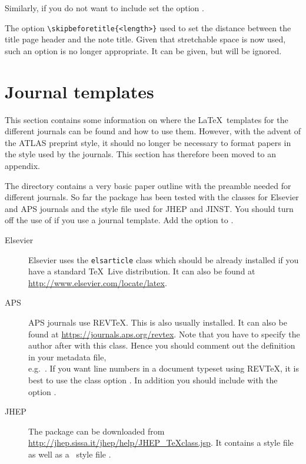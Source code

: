 Similarly, if you do not want to include  set
the option .

The option \verb|\skipbeforetitle{<length>}| used to set the distance between
the title page header and the note title. 
Given that stretchable space is now used, such an option is no longer appropriate.
It can be given, but will be ignored.


\appendix
\section{Journal templates}
\label{sec:journal}

This section contains some information on where the \LaTeX\ templates for the different journals can be found and how to use them.
However, with the advent of the ATLAS preprint style, 
it should no longer be necessary to format papers in the style used by the journals.
This section has therefore been moved to an appendix.

The directory  contains a very basic paper outline with the preamble needed for different journals.
So far the  package has been tested with the classes for Elsevier and APS journals and the style file used for JHEP and JINST.
You should turn off the use of  if you use a journal template.
Add the option  to .

\begin{description}
\item[Elsevier]Elsevier uses the \texttt{elsarticle} class which should be already installed if you have a standard 
  \TeX\ Live distribution. 
  It can also be found at \url{http://www.elsevier.com/locate/latex}.
  
\item[APS]APS journals use REV\TeX. This is also usually installed.
  It can also be found at \url{https://journals.aps.org/revtex}.
  Note that you have to specify the author after \verb|| with this class.
  Hence you should comment out the definition in your metadata file,\\
  e.g.\ .
  If you want line numbers in a document typeset using REV\TeX, it is best to use the class option .
  In addition you should include  with the option .
  
\item[JHEP]The package can be downloaded from \url{http://jhep.sissa.it/jhep/help/JHEP_TeXclass.jsp}. It contains a style file  as well as a \BibTeX\ style file . 
\end{description}


